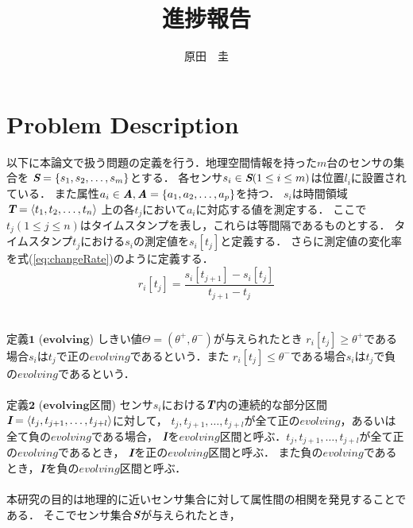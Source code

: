 \documentclass[11pt,j4a]{jarticle}
\title{進捗報告}
\author{原田　圭}
\begin{document}
\maketitle
\section{Problem Description}
以下に本論文で扱う問題の定義を行う．地理空間情報を持った$m$台のセンサの集合を
$\textit{\textbf{S}}=\{s_{1},s_{2},\ldots,s_{m}\}$とする．
各センサ$s_{i} \in \textit{\textbf{S}}(1 \leq i \leq m)$は位置$l_{i}$に設置されている．
また属性$a_{i}\in \textit{\textbf{A}},
\textit{\textbf{A}}=\{a_{1},a_{2},\ldots,a_{p}\}$を持つ．
$s_{i}$は時間領域$\textit{\textbf{T}}=\langle t_{1},t_{2},\ldots,t_{n} \rangle$
上の各$t_{j}$において$a_{i}$に対応する値を測定する．
ここで$t_{j}(1 \leq j \leq n)$はタイムスタンプを表し，これらは等間隔であるものとする．
タイムスタンプ$t_{j}$における$s_{i}$の測定値を$s_{i}[t_{j}]$と定義する．
さらに測定値の変化率を式(\ref{eq:changeRate})のように定義する．
\begin{equation}
\label{eq:changeRate}
r_{i}[t_{j}]=\frac{s_{i}[t_{j+1}]-s_{i}[t_{j}]}{t_{j+1}-t_{j}}
\end{equation}
\\\\
$\textbf{定義1}$ \hspace{2pt} ($\textbf{evolving}$) \hspace{2pt}
しきい値$\Theta = (\theta^{+},\theta^{-})$が与えられたとき
$r_{i}[t_{j}] \geq \theta^{+}$である場合$s_{i}$は$t_{j}$で正の$evolving$であるという．また
$r_{i}[t_{j}] \leq \theta^{-}$である場合$s_{i}$は$t_{j}$で負の$evolving$であるという．
\\\\
$\textbf{定義2}$ \hspace{2pt} ($\textbf{evolving区間}$) \hspace{2pt}
センサ$s_{i}$における$\textit{\textbf{T}}$内の連続的な部分区間
$\textit{\textbf{I}}=\langle t_{j},t_{j+1},\ldots,t_{j+l} \rangle$に対して，
$t_{j},t_{j+1},\ldots,t_{j+l}$が全て正の$evolving$，あるいは全て負の$evolving$である場合，
$\textit{\textbf{I}}$を$evolving$区間と呼ぶ．$t_{j},t_{j+1},\ldots,t_{j+l}$が全て正の$evolving$であるとき，
$\textit{\textbf{I}}$を正の$evolving$区間と呼ぶ．
また負の$evolving$であるとき，$\textit{\textbf{I}}$を負の$evolving$区間と呼ぶ．
\\\\
本研究の目的は地理的に近いセンサ集合に対して属性間の相関を発見することである．
そこでセンサ集合$\textit{\textbf{S}}$が与えられたとき，
\end{document}
